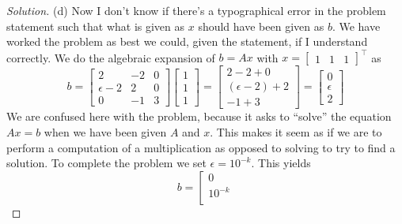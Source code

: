 \documentclass[12pt]{amsart}
\newenvironment{solution}
{\begin{proof}[Solution]}
{\end{proof}}
\begin{document}
\begin{onehalfspace}
\begin{solution}
            (d) Now I don't know if there's a typographical error in the problem statement such that what is given as $x$
            should have been given as $b$.
            We have worked the problem as best we could, given the statement, if I understand correctly.
            We do the algebraic expansion of $b=Ax$ with $x=[\begin{matrix}1 & 1& 1\end{matrix}]^\top$ as
            \begin{displaymath}
                b = \left[\begin{matrix}
                          2 & -2 & 0\\
                          \epsilon-2 & 2 & 0 \\
                          0 & -1 & 3
                \end{matrix}\right]
                \left[\begin{matrix}
                          1\\
                          1\\
                          1
                \end{matrix}\right]
                = \left[\begin{matrix}
                            2 - 2 + 0\\
                            (\epsilon - 2) + 2\\
                            -1 + 3
                \end{matrix}\right]
                = \left[\begin{matrix}
                            0\\
                            \epsilon\\
                            2
                \end{matrix}\right]
            \end{displaymath}
            We are confused here with the problem, because it asks to ``solve'' the equation
            $Ax=b$ when we have been given $A$ and $x$.
            This makes it seem as if we are to perform a computation of a multiplication
            as opposed to solving to try to find a solution.
            To complete the problem we set $\epsilon=10^{-k}$.
            This yields
            \begin{displaymath}
                b = \left[\begin{matrix}
                            0\\
                            10^{-k}\\

\end{matrix}
\end{displaymath}
\end{solution}
\end{onehalfspace}
\end{document}

